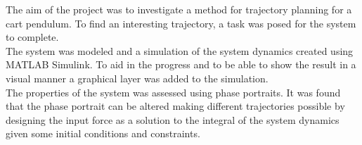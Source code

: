 The aim of the project was to investigate a method for trajectory planning for a cart pendulum. To find an interesting trajectory, a task was posed for the system to complete.\\
The system was modeled and a simulation of the system dynamics created using MATLAB Simulink. To aid in the progress and to be able to show the result in a visual manner a graphical layer was added to the simulation.\\
The properties of the system was assessed using phase portraits. It was found that the phase portrait can be altered making different trajectories possible by designing the input force as a solution to the integral of the system dynamics given some initial conditions and constraints.